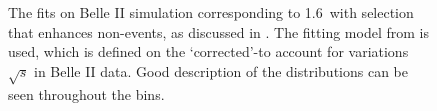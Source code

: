 \begin{figure}[htbp!]
{    }
    \caption{\label{fig:mbc_bbar_ehnhanced_fits_mc}
    The fits on Belle II simulation corresponding to 1.6~\invfb with selection 
    that enhances non-\BtoXsgamma events, as discussed in .
    The fitting model from  is used,
    which is defined on the `corrected'-\Mbc to account for variations $\sqrt{s}$ in Belle II data.
    Good description of the \Mbc distributions can be seen throughout the \EB bins.
    }
\end{figure}
